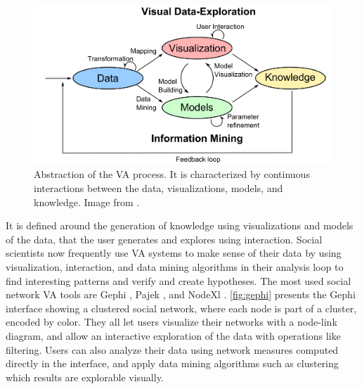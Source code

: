 \begin{figure}
    \centering %
    \includegraphics[width=1\textwidth]{static/figures/RelatedWork/Keim-VisualAnalytics.png}
    \caption{Abstraction of the VA process. It is characterized by continuous interactions between the data, visualizations, models, and knowledge. Image from \cite{keimVisualAnalyticsDefinition2008}.}
    \label{fig:keim-va}
\end{figure}

It is defined around the generation of knowledge using visualizations and models of the data, that the user generates and explores using interaction.
Social scientists now frequently use VA systems to make sense of their data by using visualization, interaction, and data mining algorithms in their analysis loop to find interesting patterns and verify and create hypotheses.
The most used social network VA tools are Gephi \cite{Gephi}, Pajek \cite{mrvarAnalysisVisualizationLarge2016}, and NodeXl \cite{NodeXL}. \autoref{fig:gephi} presents the Gephi interface showing a clustered social network, where each node is part of a cluster, encoded by color.
They all let users visualize their networks with a node-link diagram, and allow an interactive exploration of the data with operations like filtering.
Users can also analyze their data using network measures computed directly in the interface, and apply data mining algorithms such as clustering which results are explorable visually.



